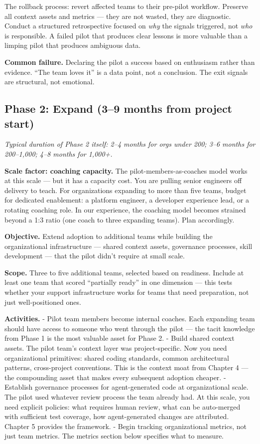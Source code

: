 \documentclass[
  a4paper,
  DIV=11,
  numbers=noendperiod]{scrreprt}
\begin{document}
The rollback process: revert affected teams to their pre-pilot workflow.
Preserve all context assets and metrics --- they are not wasted, they
are diagnostic. Conduct a structured retrospective focused on \emph{why}
the signals triggered, not \emph{who} is responsible. A failed pilot
that produces clear lessons is more valuable than a limping pilot that
produces ambiguous data.

\textbf{Common failure.} Declaring the pilot a success based on
enthusiasm rather than evidence. ``The team loves it'' is a data point,
not a conclusion. The exit signals are structural, not emotional.

\subsection{Phase 2: Expand (3--9 months from project
start)}\label{phase-2-expand-39-months-from-project-start}

\emph{Typical duration of Phase 2 itself: 2--4 months for orgs under
200; 3--6 months for 200--1,000; 4--8 months for 1,000+.}

\textbf{Scale factor: coaching capacity.} The pilot-members-as-coaches
model works at this scale --- but it has a capacity cost. You are
pulling senior engineers off delivery to teach. For organizations
expanding to more than five teams, budget for dedicated enablement: a
platform engineer, a developer experience lead, or a rotating coaching
role. In our experience, the coaching model becomes strained beyond a
1:3 ratio (one coach to three expanding teams). Plan accordingly.

\textbf{Objective.} Extend adoption to additional teams while building
the organizational infrastructure --- shared context assets, governance
processes, skill development --- that the pilot didn't require at small
scale.

\textbf{Scope.} Three to five additional teams, selected based on
readiness. Include at least one team that scored ``partially ready'' in
one dimension --- this tests whether your support infrastructure works
for teams that need preparation, not just well-positioned ones.

\textbf{Activities.} - Pilot team members become internal coaches. Each
expanding team should have access to someone who went through the pilot
--- the tacit knowledge from Phase 1 is the most valuable asset for
Phase 2. - Build shared context assets. The pilot team's context layer
was project-specific. Now you need organizational primitives: shared
coding standards, common architectural patterns, cross-project
conventions. This is the context moat from Chapter 4 --- the compounding
asset that makes every subsequent adoption cheaper. - Establish
governance processes for agent-generated code at organizational scale.
The pilot used whatever review process the team already had. At this
scale, you need explicit policies: what requires human review, what can
be auto-merged with sufficient test coverage, how agent-generated
changes are attributed. Chapter 5 provides the framework. - Begin
tracking organizational metrics, not just team metrics. The metrics
section below specifies what to measure.
\end{document}

